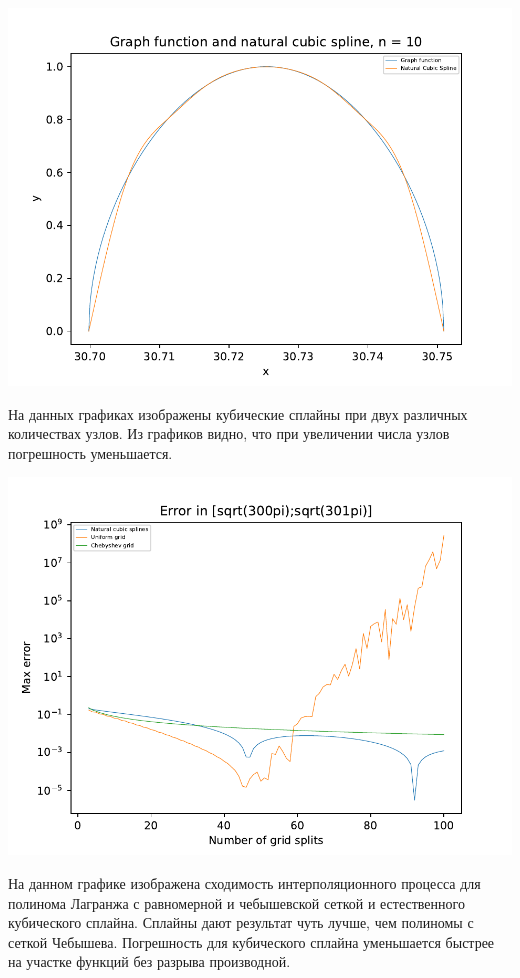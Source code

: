 \includegraphics[scale=0.75]{4.pdf}

На данных графиках изображены кубические сплайны при двух различных количествах узлов. Из графиков видно, что при увеличении числа узлов погрешность уменьшается.

\includegraphics[scale=0.75]{11.pdf}

На данном графике изображена сходимость интерполяционного процесса для полинома Лагранжа с равномерной и чебышевской сеткой и естественного кубического сплайна. Сплайны дают результат чуть лучше, чем полиномы с сеткой Чебышева. Погрешность для кубического сплайна уменьшается быстрее на участке функций без разрыва производной. 

\subsection{ \begin{math} 
		[\sqrt{700*\pi}; \sqrt{701*\pi}]
\end{math}}

